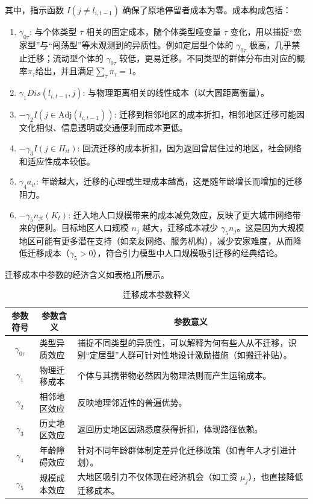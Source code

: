 \documentclass[
  a4paper,
  zihao=-4,
  fontset=mac,
  AutoFakeBold,
  AutoFakeSlant,
  oneside]{ctexbook}
\begin{document}
其中，指示函数 $I(j \neq l_{i,t-1})$ 确保了原地停留者成本为零。成本构成包括：
\begin{enumerate}
  \item $\gamma_{0\tau}$: 与个体类型 $\tau$ 相关的固定成本，随个体类型哑变量 $\tau$ 变化，用以捕捉“恋家型”与“闯荡型”等未观测到的异质性。例如定居型个体的 $\gamma_{0\tau}$ 极高，几乎禁止迁移；流动型个体的 $\gamma_{0\tau}$ 较低，更易迁移。不同类型的群体分布由对应的概率$\pi_\tau$给出，并且满足$\sum\limits_{\tau}^{} \pi_\tau=1$。

  \item $\gamma_1 Dis(l_{i,t-1}, j)$: 与物理距离相关的线性成本（以大圆距离衡量）。

  \item $-\gamma_2 I(j \in \text{Adj}(l_{i,t-1}))$: 迁移到相邻地区的成本折扣，相邻地区迁移可能因文化相似、信息透明或交通便利而成本更低。

  \item $-\gamma_3 I(j \in H_{it})$: 回流迁移的成本折扣，因为返回曾居住过的地区，社会网络和适应性成本较低。

  \item $\gamma_4 a_{it}$: 年龄越大，迁移的心理或生理成本越高，这是随年龄增长而增加的迁移阻力。

  \item $-\gamma_5 n_{jt}(K_t)$: 迁入地人口规模带来的成本减免效应，反映了更大城市网络带来的便利。目标地区人口规模 $n_j$ 越大，迁移成本减少 $\gamma_5 n_j$。这是因为大规模地区可能有更多潜在支持（如亲友网络、服务机构），减少安家难度，从而降低迁移成本（$\gamma_5 > 0$），符合引力模型中人口规模吸引迁移的经典结论。  
\end{enumerate}




迁移成本中参数的经济含义如表格\ref{tab:迁移成本参数释义}所展示。
\begin{table}[!ht]
  \centering
  \caption{迁移成本参数释义}
  \label{tab:迁移成本参数释义}
  \begin{tabularx}{\textwidth}{@{}llX@{}}
    \toprule
    \multicolumn{1}{c}{\textbf{参数符号}} & \multicolumn{1}{c}{\textbf{参数含义}} & \multicolumn{1}{c}{\textbf{参数意义}} \\ \midrule
    \multicolumn{1}{c}{$\gamma_{0\tau}$} & 类型异质效应 & 捕捉不同类型的异质性，可以解释为何有些人从不迁移，识别“定居型”人群可针对性地设计激励措施（如搬迁补贴）。\\ 
    \multicolumn{1}{c}{$\gamma_1$} & 物理迁移成本 & 个体与其携带物必然因为物理法则而产生运输成本。 \\ 
    \multicolumn{1}{c}{$\gamma_2$} & 相邻地区效应 & 反映地理邻近性的普遍优势。 \\ 
    \multicolumn{1}{c}{$\gamma_3$} & 历史地区效应 & 返回历史地区因熟悉度获得折扣，体现路径依赖。 \\ 
    \multicolumn{1}{c}{$\gamma_4$} & 年龄障碍效应 & 针对不同年龄群体制定差异化迁移政策（如青年人才引进计划）。\\ 
    \multicolumn{1}{c}{$\gamma_5$} & 规模成本效应 & 大地区吸引力不仅体现在经济机会（如工资 $\mu_j$），也直接降低迁移成本。\\ \bottomrule
  \end{tabularx}
\end{table}
\end{document}
